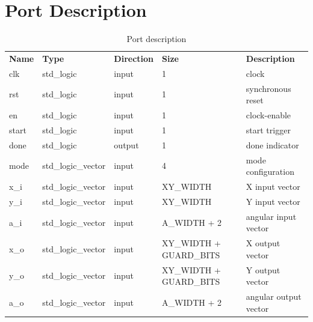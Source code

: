 \documentclass[a4paper, 12pt, notitlepage]{report}
\begin{document}
\section{Port Description}
\begin{table}[htbp]
   \center
   \begin{tabular}{@{}lllll@{}}
      \rowcolor{tableheadcolor}\textbf{Name}& \textbf{Type} & \textbf{Direction} & \textbf{Size} & \textbf{Description} \\

      \multirow{1}{*}{clk}    & std\_logic         & input  & 1 & clock              \\\midrule
      \multirow{1}{*}{rst}    & std\_logic         & input  & 1 & synchronous reset  \\\midrule
      \multirow{1}{*}{en}     & std\_logic         & input  & 1 & clock-enable       \\\midrule
      \multirow{1}{*}{start}  & std\_logic         & input  & 1 & start trigger      \\\midrule
      \multirow{1}{*}{done}   & std\_logic         & output & 1 & done indicator     \\\midrule
      \multirow{1}{*}{mode}   & std\_logic\_vector & input  & 4 & mode configuration \\\midrule
      \multirow{1}{*}{x\_i}   & std\_logic\_vector & input  & XY\_WIDTH                & X input vector        \\\midrule
      \multirow{1}{*}{y\_i}   & std\_logic\_vector & input  & XY\_WIDTH                & Y input vector        \\\midrule
      \multirow{1}{*}{a\_i}   & std\_logic\_vector & input  & A\_WIDTH + 2             & angular input vector  \\\midrule
      \multirow{1}{*}{x\_o}   & std\_logic\_vector & input  & XY\_WIDTH + GUARD\_BITS  & X output vector       \\\midrule
      \multirow{1}{*}{y\_o}   & std\_logic\_vector & input  & XY\_WIDTH + GUARD\_BITS  & Y output vector       \\\midrule
      \multirow{1}{*}{a\_o}   & std\_logic\_vector & input  & A\_WIDTH + 2             & angular output vector \\\midrule
      \bottomrule
   \end{tabular}
   \caption{Port description}
   \label{tab:ports}
\end{table} 
\end{document}
